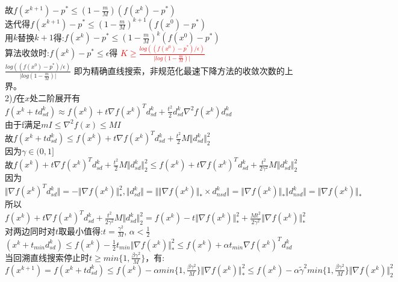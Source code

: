 \documentclass{article}
\begin{document}
故$f(x^{k+1}) - p^* \leq  (1 - \frac{m}{M})(f(x^k) - p^*)$\\
迭代得$f(x^{k+1}) - p^* \leq (1 - \frac{m}{M})^{k+1}(f(x^0) - p^*)$\\
用$k$替换$k+1$得:$f(x^k) - p^* \leq (1 - \frac{m}{M})^k(f(x^0) - p^*)$\\
算法收敛时:$f(x^k) -p^* \leq \epsilon$得 \textcolor{red}{$K \geq \frac{log((f(x^0) - p^*)/\epsilon)}{\vert log(1-\frac{m}{M}) \vert }$}\\
$\frac{log((f(x^0) - p^*)/\epsilon)}{\vert log(1-\frac{m}{M}) \vert }$ 即为精确直线搜索，非规范化最速下降方法的收敛次数的上界。\\



2)$f$在$x$处二阶展开有 $f(x^k+td^k_{sd}) \approx f(x^k) + t \nabla f(x^k)^T d^k_{sd} + \frac{t^2}{2}d^k_{sd}\nabla^2 f(x^k)d^k_{sd}$\\
由于f满足$ mI \leq \nabla^2 f(x) \leq MI$\\
故$f(x^k+td^k_{sd}) \leq f(x^k) + t \nabla f(x^k)^T d^k_{sd} + \frac{t^2}{2}M\Vert d^k_{sd} \Vert_2^2$\\
因为$\gamma \in (0,1]$\\
故$f(x^k) + t \nabla f(x^k)^T d^k_{sd} + \frac{t^2}{2}M\Vert d^k_{sd} \Vert_2^2 
\leq f(x^k) + t \nabla f(x^k)^T d^k_{sd} + \frac{t^2}{2 \gamma ^2}M\Vert d^k_{sd} \Vert_2^2$\\
因为 $\Vert \nabla f(x^k)^T d^k_{sd} \Vert = - \Vert \nabla f(x^k) \Vert^2_* , \Vert d^k_{sd} \Vert =
\Vert \Vert \nabla f(x^k) \Vert_* \times d^k_{nsd} \Vert = \Vert \nabla f(x^k) \Vert_* \Vert d^k_{nsd} \Vert = \Vert \nabla f(x^k) \Vert_*$\\
所以 $f(x^k) + t \nabla f(x^k)^T d^k_{sd} + \frac{t^2}{2 \gamma ^2}M\Vert d^k_{sd} \Vert_2^2 = f(x^k) - t \Vert \nabla f(x^k) \Vert_*^2 + \frac{Mt^2}{2 \gamma ^2} \Vert \nabla f(x^k) \Vert_* ^2$\\
对两边同时对$t$取最小值得:$t = \frac{\gamma ^2}{M}$, $\alpha < \frac{1}{2}$ \\
$(x^k+t_{min}d^k_{sd}) \leq f(x^k) - \frac{1}{2}t_{min}\Vert \nabla f(x^k) \Vert_* ^2 \leq f(x^k) + \alpha t_{min} \nabla f(x^k)^T d^k_{sd}$\\
当回溯直线搜索停止时$ t \geq min\{ 1, \frac{\beta \gamma ^2 }{M}\}$，有:\\
$f(x^{k+1}) = f(x^k+td^k_{sd}) \leq f(x^k) - \alpha min\{ 1, \frac{\beta \gamma ^2}{M}\} \Vert \nabla f(x^k) \Vert_* ^2 \leq f(x^k) - \alpha \tilde{\gamma}^2 min\{ 1, \frac{\beta \gamma ^2}{M}\} \Vert \nabla f(x^k) \Vert_2 ^2$
\end{document}
